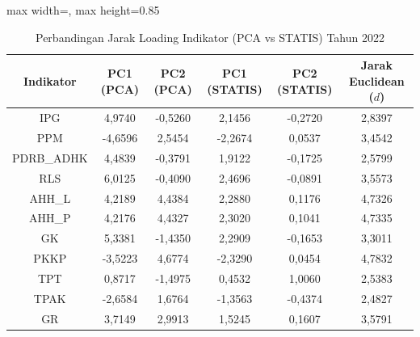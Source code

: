 \begin{table}[H]
\centering
\caption{Perbandingan Jarak Loading Indikator (PCA vs STATIS) Tahun 2022} \label{tab:app1jarak_loading_2022}
\begin{adjustbox}{max width=\textwidth, max height=0.85\textheight}
\begin{tabular}{|c|c|c|c|c|c|}
\hline
\textbf{Indikator} & \textbf{PC1 (PCA)} & \textbf{PC2 (PCA)} & \textbf{PC1 (STATIS)} & \textbf{PC2 (STATIS)} & \textbf{Jarak Euclidean ($d$)} \\
\hline
IPG & 4,9740 & -0,5260 & 2,1456 & -0,2720 & 2,8397 \\
PPM & -4,6596 & 2,5454 & -2,2674 & 0,0537 & 3,4542 \\
PDRB\_ADHK & 4,4839 & -0,3791 & 1,9122 & -0,1725 & 2,5799 \\
RLS & 6,0125 & -0,4090 & 2,4696 & -0,0891 & 3,5573 \\
AHH\_L & 4,2189 & 4,4384 & 2,2880 & 0,1176 & 4,7326 \\
AHH\_P & 4,2176 & 4,4327 & 2,3020 & 0,1041 & 4,7335 \\
GK & 5,3381 & -1,4350 & 2,2909 & -0,1653 & 3,3011 \\
PKKP & -3,5223 & 4,6774 & -2,3290 & 0,0454 & 4,7832 \\
TPT & 0,8717 & -1,4975 & 0,4532 & 1,0060 & 2,5383 \\
TPAK & -2,6584 & 1,6764 & -1,3563 & -0,4374 & 2,4827 \\
GR & 3,7149 & 2,9913 & 1,5245 & 0,1607 & 3,5791 \\
\hline
\end{tabular}
\end{adjustbox}
\end{table}